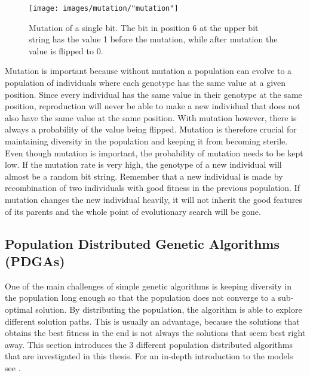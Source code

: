 \begin{figure}[h!]
\begin{center}
\texttt{[image: images/mutation/"mutation"]}
\caption{Mutation of a single bit. The bit in position 6 at the upper bit string has the value 1 before the mutation, while after mutation the value is flipped to 0.}
\label{Mutation}
\end{center}
\end{figure}


\noindent Mutation is important because without mutation a population can evolve to a population of individuals where each genotype has the same value at a given position. Since every individual has the same value in their genotype at the same position, reproduction will never be able to make a new individual that does not also have the same value at the same position. With mutation however, there is always a probability of the value being flipped. Mutation is therefore crucial for maintaining diversity in the population and keeping it from becoming sterile.\\


\noindent Even though mutation is important, the probability of mutation needs to be kept low. If the mutation rate is very high, the genotype of a new individual will almost be a random bit string. Remember that a new individual is made by recombination of two individuals with good fitness in the previous population. If mutation changes the new individual heavily, it will not inherit the good features of its parents and the whole point of evolutionary search will be gone.\\


\subsection{Population Distributed Genetic Algorithms (PDGAs)}\label{subsection:dga}
One of the main challenges of simple genetic algorithms is keeping diversity in the population long enough so that the population does not converge to a sub-optimal solution. By distributing the population, the algorithm is able to explore different solution paths. This is usually an advantage, because the solutions that obtains the best fitness in the end is not always the solutions that seem best right away. This section introduces the 3 different population distributed algorithms that are investigated in this thesis. For an in-depth introduction to the models see \citep{Gong}.\\


